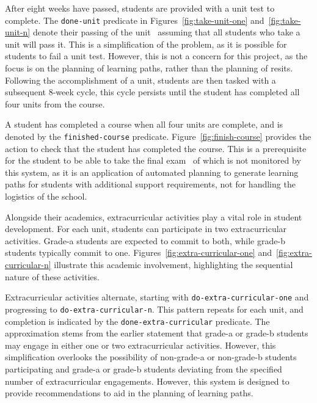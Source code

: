 After eight weeks have passed, students are provided with a unit test to complete. The \texttt{done-unit} predicate in Figures~\ref{fig:take-unit-one} and~\ref{fig:take-unit-n} denote their passing of the unit \textemdash~assuming that all students who take a unit will pass it. This is a simplification of the problem, as it is possible for students to fail a unit test. However, this is not a concern for this project, as the focus is on the planning of learning paths, rather than the planning of resits. Following the accomplishment of a unit, students are then tasked with a subsequent 8-week cycle, this cycle persists until the student has completed all four units from the course.




A student has completed a course when all four units are complete, and is denoted by the \texttt{finished-course} predicate. Figure~\ref{fig:finish-course} provides the action to check that the student has completed the course. This is a prerequisite for the student to be able to take the final exam \textemdash~of which is not monitored by this system, as it is an application of automated planning to generate learning paths for students with additional support requirements, not for handling the logistics of the school.



Alongside their academics, extracurricular activities play a vital role in student development. For each unit, students can participate in two extracurricular activities. Grade-a students are expected to commit to both, while grade-b students typically commit to one. Figures~\ref{fig:extra-curricular-one} and~\ref{fig:extra-curricular-n} illustrate this academic involvement, highlighting the sequential nature of these activities.




Extracurricular activities alternate, starting with \texttt{do-extra-curricular-one} and progressing to \texttt{do-extra-curricular-n}. This pattern repeats for each unit, and completion is indicated by the \texttt{done-extra-curricular} predicate. The approximation stems from the earlier statement that grade-a or grade-b students may engage in either one or two extracurricular activities. However, this simplification overlooks the possibility of non-grade-a or non-grade-b students participating and grade-a or grade-b students deviating from the specified number of extracurricular engagements. However, this system is designed to provide recommendations to aid in the planning of learning paths. 

